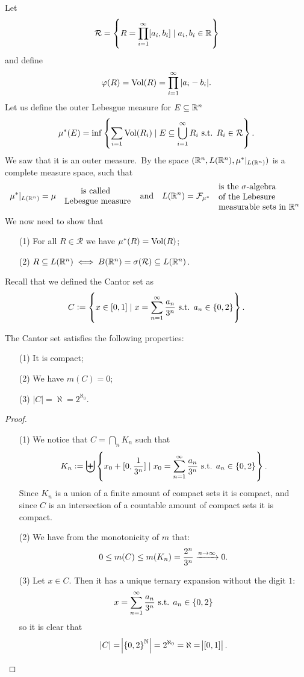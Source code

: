 \documentclass[11pt,a4paper]{article}
\begin{document}
Let
\[
  \mathcal R = \set{R = \prod_{i=1}^{\infty} [a_i,b_i] \mid a_i,b_i \in \mathbb{R}}
\]
and define
\[
  \varphi(R) = \operatorname{Vol}(R) = \prod_{i=1}^{\infty} |a_i - b_i|.
\]
Let us define the outer Lebesgue measure for $E \subseteq \mathbb{R}^n$
\[
  \mu^*(E) = \inf\set{\sum_{i=1} \operatorname{Vol}(R_i) \mid 
  E \subseteq \bigcup_{i=1}^{\infty} R_i \text{ s.t. }R_i \in \mathcal R}.
\]
We saw that it is an outer measure.\
By  the space 
$(\mathbb{R}^n, L(\mathbb{R}^n), \mu^*\vert_{L(\mathbb{R}^n)})$ is a complete measure space,
such that
\[
  \mu^*\vert_{L(\R^n)} = \mu \quad 
  \parbox{8em}{ \phantom{calle}is called \\ Lebesgue measure}
  \tand
  L(\R^n) = \mathcal F_{\mu^*} \quad
  \parbox{10em}{is the $\sigma$-algebra \\ of the Lebesure \\
  measurable sets in $\R^n$}
\]
We now need to show that
\begin{enumerate}
  \item[(1)] For all $R \in \mathcal R$ we have $\mu^*(R) = \operatorname{Vol}(R)$;
  \item[(2)] $R \subseteq L(\mathbb{R}^n) \iff 
    B(\mathbb{R}^n) = \sigma(\mathcal R) \subseteq L(\mathbb{R}^n)$.
\end{enumerate}


\begin{remark}
  Recall that we defined the Cantor set as
  \[
    C := \set{x \in [0,1] \mid x = \sum_{n=1}^{\infty} \frac{a_n}{3^n} \text{ s.t. }a_n \in \set{0,2}}.
  \]
\end{remark}

\begin{proposition}
  The Cantor set satisfies the following properties:
  \begin{enumerate}
    \item[(1)] It is compact;
    \item[(2)] We have $m(C) = 0$;
    \item[(3)] $|C| = \aleph = 2^{\aleph_0}$.
  \end{enumerate}
\end{proposition}
\begin{proof} \phantom{}
\begin{enumerate}
\item[(1)] We notice that
  $C = \bigcap_{n} K_n$ such that
  \[
    K_n := \biguplus
    \set{x_0 + [0,\frac{1}{3^{n}}] \mid x_0 = 
    \sum_{n=1}^{\infty} \frac{a_n}{3^n} \text{ s.t. }a_n \in \set{0,2}}.
  \]
  Since $K_n$ is a union of a finite amount of compact sets it is compact,
  and since $C$ is an intersection of a countable amount of compact sets
  it is compact.
\item[(2)] We have from the monotonicity of $m$ that:
  \[
    0 \le m(C) \le m(K_n) = \frac{2^n}{3^n} \xrightarrow{n \to \infty} 0.
  \]
\item[(3)] Let $x \in C$. Then it has a unique ternary expansion without
  the digit $1$:
  \[
    x = \sum_{n=1}^{\infty} \frac{a_n}{3^n} \text{ s.t. } a_n \in \set{0,2}
  \]
  so it is clear that
  \[
    |C| = \abs{\set{0,2}^{\mathbb{N}}} = 2^{\aleph_0} = \aleph = \abs{[0,1]}.
  \]
\end{enumerate}
\end{proof}
\end{document}
